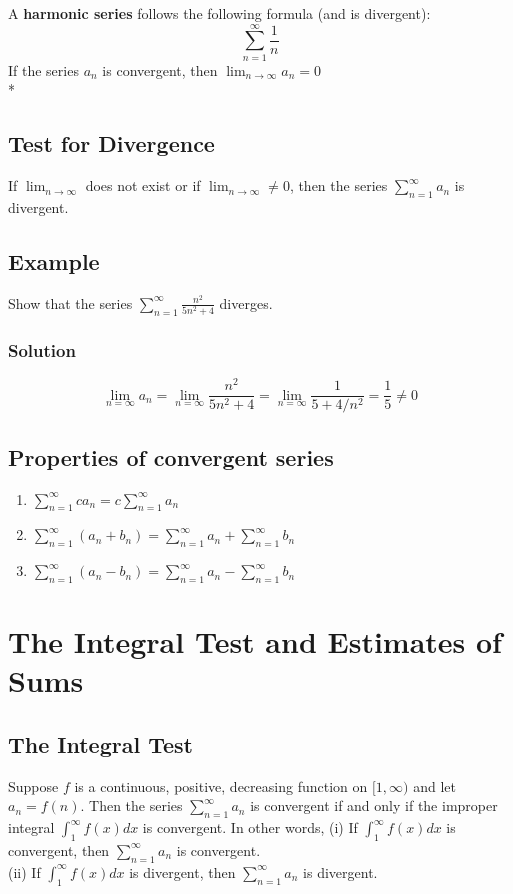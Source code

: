 A \textbf{harmonic series} follows the following formula (and is divergent): $$\sum^\infty_{n = 1}\frac{1}{n}$$
If the series $a_n$ is convergent, then $\lim_{n\rightarrow\infty}a_n = 0$\\*
\subsection*{Test for Divergence}
If $\lim_{n\rightarrow\infty}$ does not exist or if $\lim_{n\rightarrow\infty}\neq 0$, then the series $\sum^\infty_{n = 1}a_n$ is divergent.
\subsection*{Example} 
Show that the series $\sum^\infty_{n = 1} \frac{n^2}{5n^2 + 4}$ diverges.
\subsubsection*{Solution}
$$\lim_{n = \infty} a_n = \lim_{n = \infty} \frac{n^2}{5n^2 + 4} = \lim_{n = \infty} \frac{1}{5 + 4/n^2} = \frac{1}{5}\neq 0$$

\subsection*{Properties of convergent series}
\begin{enumerate}[i]
    \item $\sum^\infty_{n = 1} ca_n = c\sum^\infty_{n = 1}a_n$
    \item $\sum^\infty_{n = 1} (a_n + b_n) = \sum^\infty_{n = 1}a_n + \sum^\infty_{n = 1}b_n$
    \item $\sum^\infty_{n = 1} (a_n - b_n) = \sum^\infty_{n = 1}a_n - \sum^\infty_{n = 1}b_n$
\end{enumerate}

\section{The Integral Test and Estimates of Sums}
\subsection*{The Integral Test}
Suppose $f$ is a continuous, positive, decreasing function on $[1,\infty)$ and let $a_n = f(n)$. Then the series $\textstyle\sum^\infty_{n = 1}a_n$ is convergent if and only if the improper integral 
$\int^\infty_1f(x) dx$ is convergent. In other words, 
(i) If $\int^\infty_1f(x) dx$ is convergent, then $\sum^\infty_{n = 1}a_n$ is convergent.\\
(ii) If $\int^\infty_1f(x) dx$ is divergent, then $\sum^\infty_{n = 1}a_n$ is divergent.

